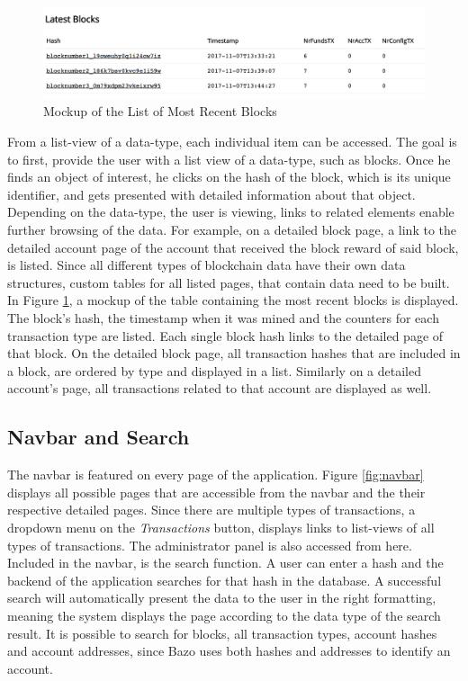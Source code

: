 \begin{figure}
  \includegraphics[width=\linewidth]{mockup1.png}
  \centering
  \caption{Mockup of the List of Most Recent Blocks}
  \label{fig:mockup1}
\end{figure}

From a list-view of a data-type, each individual item can be accessed. The goal is to first, provide the user with a list view of a data-type, such as blocks. Once he finds an object of interest, he clicks on the hash of the block, which is its unique identifier, and gets presented with detailed information about that object. Depending on the data-type, the user is viewing, links to related elements enable further browsing of the data. For example, on a detailed block page, a link to the detailed account page of the account that received the block reward of said block, is listed. Since all different types of blockchain data have their own data structures, custom tables for all listed pages, that contain data need to be built. In Figure \ref{fig:mockup1}, a mockup of the table containing the most recent blocks is displayed. The block's hash, the timestamp when it was mined and the counters for each transaction type are listed. Each single block hash links to the detailed page of that block. On the detailed block page, all transaction hashes that are included in a block, are ordered by type and displayed in a list. Similarly on a detailed account's page, all transactions related to that account are displayed as well.

\subsection{Navbar and Search}
The navbar is featured on every page of the application. Figure \ref{fig:navbar} displays all possible pages that are accessible from the navbar and the their respective detailed pages. Since there are multiple types of transactions, a dropdown menu on the \emph{Transactions} button, displays links to list-views of all types of transactions. The administrator panel is also accessed from here. Included in the navbar, is the search function. A user can enter a hash and the backend of the application searches for that hash in the database. A successful search will automatically present the data to the user in the right formatting, meaning the system displays the page according to the data type of the search result. It is possible to search for blocks, all transaction types, account hashes and account addresses, since Bazo uses both hashes and addresses to identify an account.

